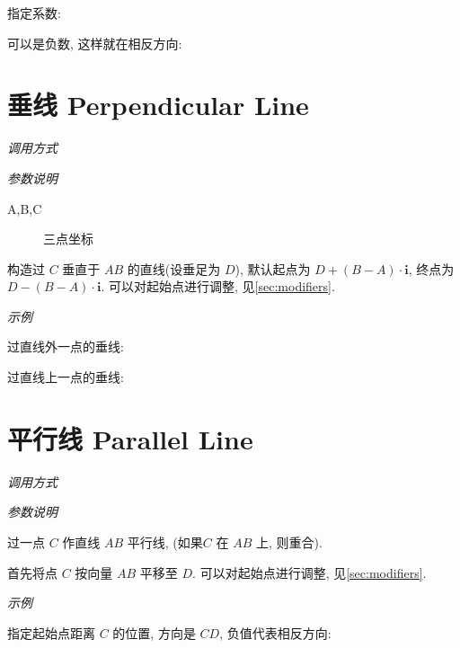 指定系数:


可以是负数, 这样就在相反方向:


\section{垂线 Perpendicular Line}

\emph{调用方式}

\begin{tcolorbox}{}
\end{tcolorbox}

\emph{参数说明}

\begin{description}
  \item[A,B,C] 三点坐标 
\end{description}

构造过 $C$ 垂直于 $AB$ 的直线(设垂足为 $D$), 默认起点为 $D+(B-A) \cdot \mathbf{i}$, 终点为 $D-(B-A) \cdot \mathbf{i}$.
可以对起始点进行调整, 见\ref{sec:modifiers}.

\emph{示例}

过直线外一点的垂线:


过直线上一点的垂线:


\section{平行线 Parallel Line}

\emph{调用方式}

\begin{tcolorbox}{}
\end{tcolorbox}

\emph{参数说明}

过一点 $C$ 作直线 $AB$ 平行线, (如果$C$ 在 $AB$ 上, 则重合).

首先将点 $C$ 按向量 $AB$ 平移至 $D$. 
可以对起始点进行调整, 见\ref{sec:modifiers}.

\emph{示例}

指定起始点距离 $C$ 的位置, 方向是 $CD$, 负值代表相反方向:

